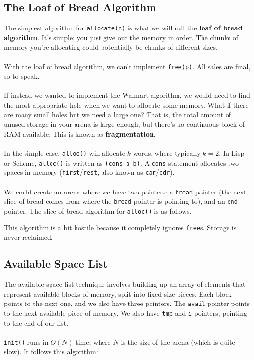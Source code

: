 \documentclass[]{article}
\theoremstyle{definition}
\newcommand{\lecture}[1]{\marginpar{{\footnotesize $\leftarrow$ \underline{#1}}}}
\begin{document}
		\subsection{The Loaf of Bread Algorithm}
			The simplest algorithm for \verb+allocate(n)+ is what we will call the \textbf{loaf of bread algorithm}. It's simple: you just give out the memory in order. The chunks of memory you're allocating could potentially be chunks of different sizes.
			\\ \\
			With the loaf of bread algorithm, we can't implement \verb+free(p)+. All sales are final, so to speak.
			\\ \\
			If instead we wanted to implement the Walmart algorithm, we would need to find the most appropriate hole when we want to allocate some memory. What if there are many small holes but we need a large one? That is, the total amount of unused storage in your arena is large enough, but there's no continuous block of RAM available. This is known as \textbf{fragmentation}. \lecture{March 27, 2013}
			\\ \\
			In the simple case, \verb+alloc()+ will allocate $k$ words, where typically $k = 2$. In Lisp or Scheme, \verb+alloc()+ is written as \verb+(cons a b)+. A \verb+cons+ statement allocates two spaces in memory (\verb+first+/\verb+rest+, also known as \verb+car+/\verb+cdr+).
			\\ \\
			We could create an arena where we have two pointers: a \verb+bread+ pointer (the next slice of bread comes from where the \verb+bread+ pointer is pointing to), and an \verb+end+ pointer. The slice of bread algorithm for \verb+alloc()+ is as follows.

			\begin{algorithm}[H]
			\end{algorithm}

			This algorithm is a bit hostile because it completely ignores \verb+free+s. Storage is never reclaimed.
		
		\subsection{Available Space List}
			The available space list technique involves building up an array of elements that represent available blocks of memory, split into fixed-size pieces. Each block points to the next one, and we also have three pointers. The \verb+avail+ pointer points to the next available piece of memory. We also have \verb+tmp+ and \verb+i+ pointers, pointing to the end of our list.
			\\ \\
			\verb+init()+ runs in $O(N)$ time, where $N$ is the size of the arena (which is quite slow). It follows this algorithm:
\end{document}
